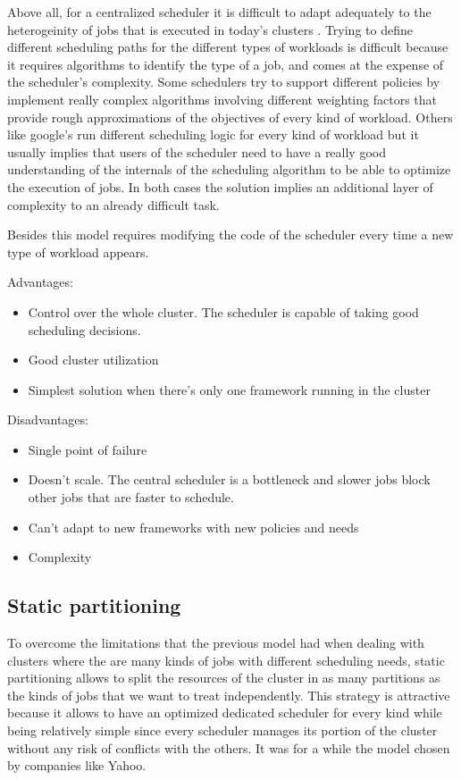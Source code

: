 \documentclass{svjour3}                     %
\begin{document}
Above all, for a centralized scheduler it is difficult to adapt
adequately to the heterogeinity of jobs that is executed in today's
clusters \cite{37201}. Trying to define different
scheduling paths for the different types of workloads is difficult
because it requires algorithms to identify the type of a job, and comes
at the expense of the scheduler's complexity. Some schedulers try to
support different policies by implement really complex algorithms
involving different weighting factors that provide rough
approximations of the objectives of every kind of workload. Others
like google's run different scheduling logic for every kind of
workload but it usually implies that users of the scheduler need to
have a really good understanding of the internals of the scheduling
algorithm to be able to optimize the execution of jobs. In both cases
the solution implies an additional layer of complexity to an already
difficult task.

Besides this model requires modifying the code of the scheduler every
time a new type of workload appears. 

Advantages:

\begin{itemize}
  \item Control over the whole cluster. The scheduler is capable of taking good scheduling decisions.
  \item Good cluster utilization
  \item Simplest solution when there's only one framework running in the cluster
\end{itemize}

Disadvantages:

\begin{itemize}
  \item Single point of failure
  \item Doesn't scale. The central scheduler is a bottleneck and
    slower jobs block other jobs that are faster to schedule.
  \item Can't adapt to new frameworks with new policies and needs
  \item Complexity
\end{itemize}

\subsection{Static partitioning}

To overcome the limitations that the previous model had when dealing
with clusters where the are many kinds of jobs with different scheduling
needs, static partitioning allows to split the resources of the cluster
in as many partitions as the kinds of jobs that we want to
treat independently. This strategy is attractive because it allows to
have an optimized dedicated scheduler for every kind while being
relatively simple since every scheduler manages its portion of the
cluster without any risk of conflicts with the others. It was
for a while the model chosen by companies like Yahoo.
\end{document}
